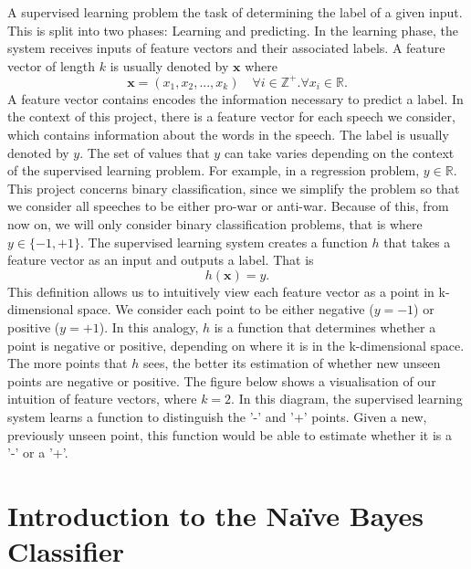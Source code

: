 \documentclass[12pt,a4paper,twoside,openright]{report}
\begin{document}
A supervised learning problem the task of determining the label of a given input. This is split into two phases: Learning and predicting.
\newline
\newline
In the learning phase, the system receives inputs of feature vectors and their associated labels. A feature vector of length $k$ is usually denoted by $\mathbf{x}$ where 
\begin{equation}
	\mathbf{x} = (x_1, x_2, ..., x_k) \quad \forall i \in \mathbb{Z}^+ . \forall x_i \in \mathbb{R}.
\end{equation}
A feature vector contains encodes the information necessary to predict a label. In the context of this project, there is a feature vector for each speech we consider, which contains information about the words in the speech. The label is usually denoted by $y$. The set of values that $y$ can take varies depending on the context of the supervised learning problem. For example, in a regression problem, $y \in \mathbb{R}$. This project concerns binary classification, since we simplify the problem so that we consider all speeches to be either pro-war or anti-war. Because of this, from now on, we will only consider binary classification problems, that is where $y \in \{-1, +1\}$.
\newline
\newline
The supervised learning system creates a function $h$ that takes a feature vector as an input and outputs a label. That is
\begin{equation}
	h(\mathbf{x}) = y.
\end{equation}
This definition allows us to intuitively view each feature vector as a point in k-dimensional space. We consider each point to be either negative ($y = -1$) or positive ($y = +1$). In this analogy, $h$ is a function that determines whether a point is negative or positive, depending on where it is in the k-dimensional space. The more points that $h$ sees, the better its estimation of whether new unseen points are negative or positive.
\newline
\newline
The figure below shows a visualisation of our intuition of feature vectors, where $k = 2$. In this diagram, the supervised learning system learns a function to distinguish the '-' and '+' points. Given a new, previously unseen point, this function would be able to estimate whether it is a '-' or a '+'.
\section{Introduction to the Na\"{i}ve Bayes Classifier} \label{prep-bayes}
\end{document}

